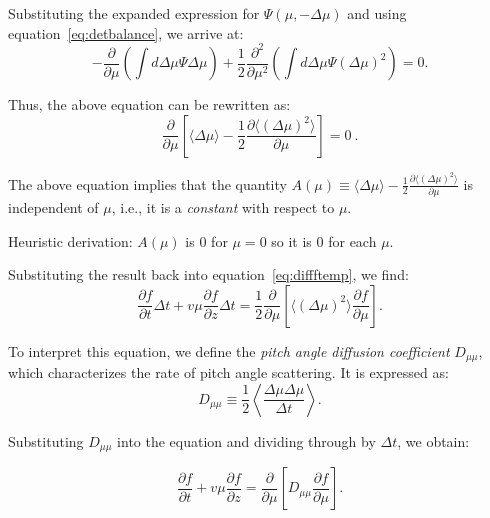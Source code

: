 Substituting the expanded expression for \( \Psi(\mu, -\Delta \mu) \) and using equation~\eqref{eq:detbalance}, we arrive at:
\begin{equation}
-\frac{\partial}{\partial \mu} \left( \int d\Delta \mu \Psi \Delta \mu \right) + \frac{1}{2} \frac{\partial^2}{\partial \mu^2} \left( \int d\Delta \mu \Psi (\Delta \mu)^2 \right) = 0.
\end{equation}

Thus, the above equation can be rewritten as:
\begin{equation}
\frac{\partial}{\partial \mu} \left[ \langle \Delta \mu \rangle - \frac{1}{2} \frac{\partial \langle (\Delta \mu)^2 \rangle}{\partial \mu} \right] = 0~.
\end{equation}

The above equation implies that the quantity \( A(\mu) \equiv \langle \Delta \mu \rangle - \frac{1}{2} \frac{\partial  \langle (\Delta \mu)^2 \rangle}{\partial \mu} \) is independent of \( \mu \), i.e., it is a \emph{constant} with respect to \( \mu \). 

{\color{red}Heuristic derivation: \( A(\mu) \) is 0 for \( \mu = 0 \) so it is 0 for each \( \mu \).}

Substituting the result back into equation~\eqref{eq:diffftemp}, we find:
\begin{equation}
\frac{\partial f}{\partial t} \Delta t  +  v \mu \frac{\partial f}{\partial z} \Delta t = 
\frac{1}{2} \frac{\partial}{\partial \mu} \left[ \langle (\Delta \mu)^2 \rangle \frac{\partial f}{\partial \mu} \right].
\end{equation}

To interpret this equation, we define the \emph{pitch angle diffusion coefficient} \( D_{\mu\mu} \), which characterizes the rate of pitch angle scattering. It is expressed as:
\begin{equation}
D_{\mu\mu} \equiv \frac{1}{2} \left\langle \frac{\Delta \mu \Delta \mu}{\Delta t} \right\rangle.
\end{equation}

Substituting \( D_{\mu\mu} \) into the equation and dividing through by \( \Delta t \), we obtain:
\begin{remark}
\begin{equation}\label{eq:fdiffmu}
\frac{\partial f}{\partial t} + v \mu \frac{\partial f}{\partial z} = \frac{\partial}{\partial \mu} \left[ D_{\mu\mu} \frac{\partial f}{\partial \mu} \right].
\end{equation}
\end{remark}

